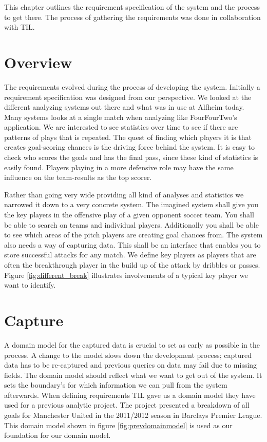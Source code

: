 This chapter outlines the requirement specification of the system and the process to get there. The process of gathering the requirements was done in collaboration with \ac{TIL}.

\section{Overview}
The requirements evolved during the process of developing the system. Initially a requirement specification was designed from our perspective. We looked at the different analyzing systems out there and what was in use at Alfheim today. Many systems looks at a single match when analyzing like FourFourTwo’s application. We are interested to see statistics over time to see if there are patterns of plays that is repeated. The quest of finding which players it is that creates goal-scoring chances is the driving force behind the system. It is easy to check who scores the goals and has the final pass, since these kind of statistics is easily found. Players playing in a more defensive role may have the same influence on the team-results as the top scorer.

Rather than going very wide providing all kind of analyses and statistics we narrowed it down to a very concrete system. The imagined system shall give you the key players in the offensive play of a given opponent soccer team. You shall be able to search on teams and individual players. Additionally you shall be able to see which areas of the pitch players are creating goal chances from. The system also needs a way of capturing data. This shall be an interface that enables you to store successful attacks for any match. We define key players as players that are often the breakthrough player in the build up of the attack by dribbles or passes. Figure \ref{fig:different_break} illustrates involvements of a typical key player we want to identify.

\section{Capture}

A domain model for the captured data is crucial to set as early as possible in the process. A change to the model slows down the development process; captured data has to be re-captured and previous queries on data may fail due to missing fields. The domain model should reflect what we want to get out of the system. It sets the boundary's for which information we can pull from the system afterwards. When defining requirements \ac{TIL} gave us a domain model they have used for a previous analytic project. The project presented a breakdown of all goals for Manchester United in the 2011/2012 season in Barclays Premier League. This domain model shown in figure \ref{fig:prevdomainmodel} is used as our foundation for our domain model. 

